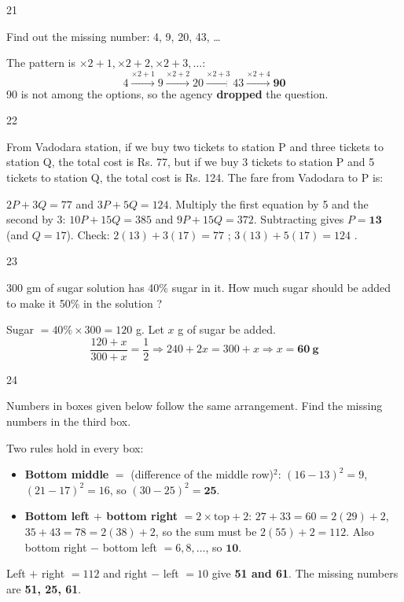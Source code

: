 \begin{question}{21}
{Find out the missing number: 4, 9, 20, 43, \ldots{}\par}
\dropped{}
\begin{explain}
The pattern is $\times2+1, \times2+2, \times2+3, \ldots$:
\[4\xrightarrow{\times2+1}9\xrightarrow{\times2+2}20\xrightarrow{\times2+3}43\xrightarrow{\times2+4}\mathbf{90}\]
90 is not among the options, so the agency \textbf{dropped} the question.
\end{explain}
\end{question}

\begin{question}{22}
{From Vadodara station, if we buy two tickets to station P and three tickets to station Q, the total cost is Rs. 77, but if we buy 3 tickets to station P and 5 tickets to station Q, the total cost is Rs. 124. The fare from Vadodara to P is:\par}
\begin{explain}
$2P+3Q=77$ and $3P+5Q=124$.
Multiply the first equation by 5 and the second by 3: $10P+15Q=385$ and $9P+15Q=372$. Subtracting gives $P=\mathbf{13}$ (and $Q=17$).
Check: $2(13)+3(17)=77$ \checkmark; $3(13)+5(17)=124$ \checkmark.
\end{explain}
\end{question}

\begin{question}{23}
{300 gm of sugar solution has 40\% sugar in it. How much sugar should be added to make it 50\% in the solution ?\par}
\begin{explain}
Sugar $=40\%\times300=120$ g. Let $x$ g of sugar be added.
\[\frac{120+x}{300+x}=\frac12\Rightarrow240+2x=300+x\Rightarrow x=\mathbf{60\ g}\]
\end{explain}
\end{question}

\begin{question}{24}
{Numbers in boxes given below follow the same arrangement. Find the missing numbers in the third box.\par}
\begin{explain}
Two rules hold in every box:
\begin{itemize}
\item \textbf{Bottom middle} $=$ (difference of the middle row)$^2$: $(16-13)^2=9$, $(21-17)^2=16$, so $(30-25)^2=\mathbf{25}$.
\item \textbf{Bottom left $+$ bottom right} $=2\times\text{top}+2$: $27+33=60=2(29)+2$, $35+43=78=2(38)+2$, so the sum must be $2(55)+2=112$. Also bottom right $-$ bottom left $=6, 8, \ldots$, so $\mathbf{10}$.
\end{itemize}
Left $+$ right $=112$ and right $-$ left $=10$ give \textbf{51 and 61}. The missing numbers are \textbf{51, 25, 61}.
\end{explain}
\end{question}

